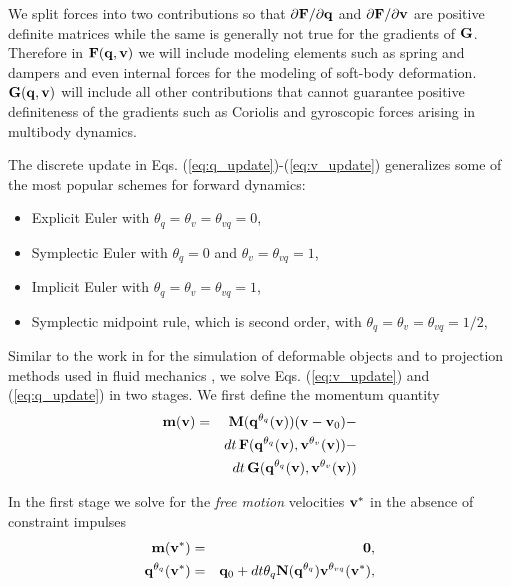 We split forces into two contributions so that $\partial {\mathbf{F}}/\partial{\mathbf{q}}$ and $\partial {\mathbf{F}}/\partial{\mathbf{v}}$ are positive definite matrices while the same is generally not true for the gradients of ${\mathbf{G}}$. Therefore in ${\mathbf{F}}({\mathbf{q}}, {\mathbf{v}})$ we will include modeling elements such as spring and dampers and even internal forces
for the modeling of soft-body deformation. ${\mathbf{G}}({\mathbf{q}}, {\mathbf{v}})$ will include
all other contributions that cannot guarantee positive definiteness of the
gradients such as Coriolis and gyroscopic forces arising in multibody dynamics.

The discrete update in Eqs. (\ref{eq:q_update})-(\ref{eq:v_update}) generalizes
some of the most popular schemes for forward dynamics:
\begin{itemize}
	\item Explicit Euler with $\theta_q=\theta_{v}=\theta_{vq} = 0$,
	\item Symplectic Euler with $\theta_{q} = 0$ and $\theta_v = \theta_{vq}=1$,
	\item Implicit Euler with $\theta_{q} = \theta_v = \theta_{vq}= 1$,
	\item Symplectic midpoint rule, which is second order, with $\theta_{q} =
	\theta_v = \theta_{vq}= 1/2$,
\end{itemize}

Similar to the work in \cite{bib:duriez2005realistic} for the simulation of
deformable objects and to projection methods used in fluid mechanics
\cite{bib::bell1991efficient}, we solve Eqs. (\ref{eq:v_update}) and
(\ref{eq:q_update}) in two stages. We first define the momentum quantity
\begin{eqnarray}
	\mf{m}(\mf{v}) &=&
	\mf{M}(\mf{q}^{\theta_{q}}(\mf{v}))(\mf{v}-\mf{v}_0) - \nonumber\\
	&&dt\,\mf{F}(\mf{q}^{\theta_{q}}(\mf{v}), \mf{v}^{\theta_v}(\mf{v}))-\nonumber\\
	&&dt\,\mf{G}(\mf{q}^{\theta_{q}}(\mf{v}), \mf{v}^{\theta_v}(\mf{v}))
	\label{eq:m_definition}
\end{eqnarray}

In the first stage we solve for the
\textit{free motion} velocities ${\mathbf{v}}^*$ in the absence of constraint impulses
\begin{eqnarray}
	\mf{m}(\mf{v}^*) &=& \mf{0},
	\label{eq:vstar_definition}\\
	\mf{q}^{\theta_q}(\mf{v}^*) &=& \mf{q}_0 + dt\theta_q\mf{N}(\mf{q}^{\theta_{q}})\mf{v}^{\theta_{vq}}(\mf{v}^*),
	\label{eq:qstar_definition}
\end{eqnarray}

